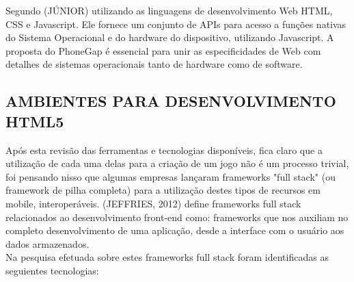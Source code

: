 \documentclass{article}
\begin{document}
Segundo (JÚNIOR) utilizando as linguagens de desenvolvimento Web HTML, CSS e Javascript. Ele fornece um conjunto de APIs para acesso a funções nativas do Sistema Operacional e do hardware do dispositivo, utilizando Javascript. A proposta do PhoneGap é essencial para unir as especificidades de Web com detalhes de sistemas operacionais tanto de hardware como de software.

\subsection{AMBIENTES PARA DESENVOLVIMENTO HTML5}

Após esta revisão das ferramentas  e tecnologias disponíveis, fica claro que a utilização de cada uma delas para a criação de um jogo não é um processo trivial, foi pensando nisso que algumas empresas lançaram frameworks "full stack"  (ou framework de pilha completa) para a utilização destes tipos de recursos em mobile, interoperáveis. (JEFFRIES, 2012) define frameworks full stack relacionados ao desenvolvimento front-end como: frameworks que nos auxiliam no completo desenvolvimento de uma aplicação, desde a interface com o usuário aos dados armazenados.
\\
Na pesquisa efetuada sobre estes frameworks full stack foram identificadas as seguientes tecnologias:
\end{document}
